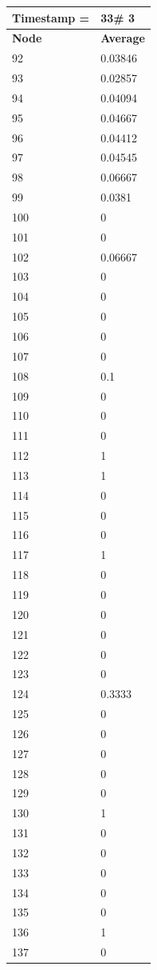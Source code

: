 \begin{tabular}{|l||l|}
\hline
\textbf{Timestamp =} & \textbf{33}\# 3\\\hline
	\textbf{Node} & \textbf{Average} \\ \hline
\hline
	92 & 0.03846 \\ \hline
	93 & 0.02857 \\ \hline
	94 & 0.04094 \\ \hline
	95 & 0.04667 \\ \hline
	96 & 0.04412 \\ \hline
	97 & 0.04545 \\ \hline
	98 & 0.06667 \\ \hline
	99 & 0.0381 \\ \hline
	100 & 0 \\ \hline
	101 & 0 \\ \hline
	102 & 0.06667 \\ \hline
	103 & 0 \\ \hline
	104 & 0 \\ \hline
	105 & 0 \\ \hline
	106 & 0 \\ \hline
	107 & 0 \\ \hline
	108 & 0.1 \\ \hline
	109 & 0 \\ \hline
	110 & 0 \\ \hline
	111 & 0 \\ \hline
	112 & 1 \\ \hline
	113 & 1 \\ \hline
	114 & 0 \\ \hline
	115 & 0 \\ \hline
	116 & 0 \\ \hline
	117 & 1 \\ \hline
	118 & 0 \\ \hline
	119 & 0 \\ \hline
	120 & 0 \\ \hline
	121 & 0 \\ \hline
	122 & 0 \\ \hline
	123 & 0 \\ \hline
	124 & 0.3333 \\ \hline
	125 & 0 \\ \hline
	126 & 0 \\ \hline
	127 & 0 \\ \hline
	128 & 0 \\ \hline
	129 & 0 \\ \hline
	130 & 1 \\ \hline
	131 & 0 \\ \hline
	132 & 0 \\ \hline
	133 & 0 \\ \hline
	134 & 0 \\ \hline
	135 & 0 \\ \hline
	136 & 1 \\ \hline
	137 & 0 \\ \hline
\end{tabular}

